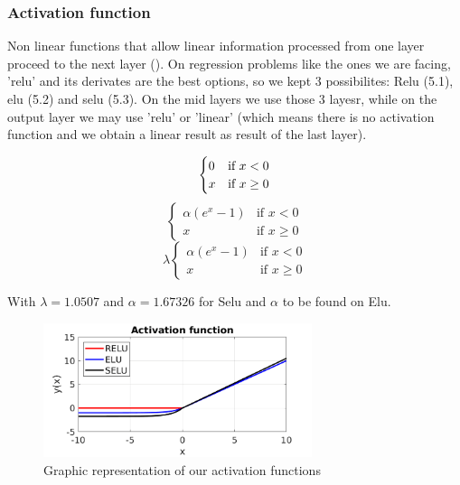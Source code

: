 \documentclass[openany]{article}
\begin{document}
\subsubsection*{Activation function}

Non linear functions that allow linear information processed from one layer proceed to the next layer (\cite{sharma2017activation}). On regression problems like the ones we are facing, 'relu' and its derivates are the best options, so we kept 3 possibilites: Relu (5.1), elu (5.2) and selu (5.3). On the mid layers we use those 3 layesr, while on the output layer we may use 'relu' or 'linear' (which means there is no activation function and we obtain a linear result as result of the last layer).



\begin{multicols}{3}
\begin{equation}
\centering
    \begin{cases}
    0 & \text{if } x < 0\\
    x & \text{if } x \geq 0
\end{cases}
\end{equation}\break
\begin{equation}
    \begin{cases}
    \alpha(e^x - 1) & \text{if } x < 0\\
    x & \text{if } x \geq 0
\end{cases}
\end{equation}\break
\begin{equation}
    \lambda \begin{cases}
    \alpha(e^x - 1) & \text{if } x < 0\\
    x & \text{if } x \geq 0 
    \end{cases}
\end{equation}
\end{multicols}

With \(\lambda = 1.0507\) and \(\alpha = 1.67326\) for Selu and \(\alpha\) to be found on Elu.


\begin{figure}[!h]
    \centering
    \includegraphics[width=0.7\textwidth]{Activations.png}
    \caption{Graphic representation of our activation functions}
    \label{fig:my_label}
\end{figure}
\end{document}
